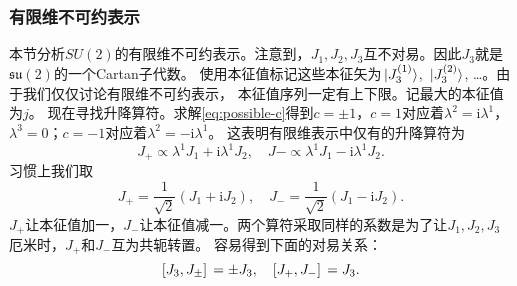 \documentclass[hyperref, UTF8, a4paper]{ctexart}
\newcommand*{\ii}{\mathrm{i}}
\begin{document}
\subsubsection{有限维不可约表示}

本节分析$SU(2)$的有限维不可约表示。注意到，$J_1, J_2, J_3$互不对易。因此$J_3$就是$\mathfrak{su}(2)$的一个Cartan子代数。
使用本征值标记这些本征矢为$\ket*{J_3^{(1)}}$, $\ket*{J_3^{(2)}}$, \dots。由于我们仅仅讨论有限维不可约表示，
本征值序列一定有上下限。记最大的本征值为$j$。
现在寻找升降算符。求解\eqref{eq:possible-c}得到$c = \pm 1$，$c=1$对应着$\lambda^2 = \ii \lambda^1$，$\lambda^3 = 0$；$c=-1$对应着$\lambda^2 = - \ii \lambda^1$。
这表明有限维表示中仅有的升降算符为
\[
    J_+ \propto \lambda^1 J_1 + \ii \lambda^1 J_2, \quad J- \propto \lambda^1 J_1 - \ii \lambda^1 J_2. 
\]
习惯上我们取
\begin{equation}
    J_+ = \frac{1}{\sqrt{2}} (J_1 + \ii J_2), \quad J_- = \frac{1}{\sqrt{2}} (J_1 - \ii J_2).
\end{equation}
$J_+$让本征值加一，$J_-$让本征值减一。两个算符采取同样的系数是为了让$J_1,J_2,J_3$厄米时，$J_+$和$J_-$互为共轭转置。
容易得到下面的对易关系：
\begin{equation}
    \comm*{J_3}{J_{\pm}} = \pm J_3, \quad \comm*{J_+}{J_-} = J_3.
\end{equation}
\end{document}
